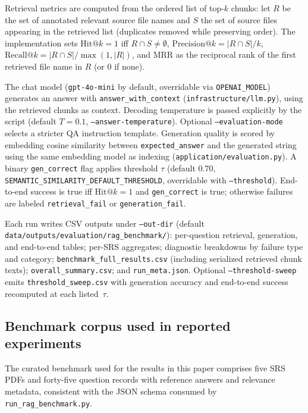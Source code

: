 \documentclass[conference]{IEEEtran}
\begin{document}
Retrieval metrics are computed from the ordered list of top-$k$ chunks: let $R$ be the set of annotated relevant source file names and $S$ the set of source files appearing in the retrieved list (duplicates removed while preserving order). The implementation sets $\text{Hit@}k{=}1$ iff $R \cap S \neq \emptyset$, $\text{Precision@}k = |R \cap S|/k$, $\text{Recall@}k = |R \cap S|/\max(1,|R|)$, and MRR as the reciprocal rank of the first retrieved file name in $R$ (or $0$ if none).

The chat model (\texttt{gpt-4o-mini} by default, overridable via \texttt{OPENAI\_MODEL}) generates an answer with \texttt{answer\_with\_context} (\texttt{infrastructure/llm.py}), using the retrieved chunks as context. Decoding temperature is passed explicitly by the script (default $T{=}0.1$, \texttt{--answer-temperature}). Optional \texttt{--evaluation-mode} selects a stricter QA instruction template. Generation quality is scored by embedding cosine similarity between \texttt{expected\_answer} and the generated string using the same embedding model as indexing (\texttt{application/evaluation.py}). A binary \texttt{gen\_correct} flag applies threshold $\tau$ (default $0.70$, \texttt{SEMANTIC\_SIMILARITY\_DEFAULT\_THRESHOLD}, overridable with \texttt{--threshold}). End-to-end success is true iff $\text{Hit@}k{=}1$ and \texttt{gen\_correct} is true; otherwise failures are labeled \texttt{retrieval\_fail} or \texttt{generation\_fail}.

Each run writes CSV outputs under \texttt{--out-dir} (default \texttt{data/outputs/evaluation/rag\_benchmark/}): per-question retrieval, generation, and end-to-end tables; per-SRS aggregates; diagnostic breakdowns by failure type and category; \texttt{benchmark\_full\_results.csv} (including serialized retrieved chunk texts); \texttt{overall\_summary.csv}; and \texttt{run\_meta.json}. Optional \texttt{--threshold-sweep} emits \texttt{threshold\_sweep.csv} with generation accuracy and end-to-end success recomputed at each listed~$\tau$.

\subsection{Benchmark corpus used in reported experiments}

The curated benchmark used for the results in this paper comprises five SRS PDFs and forty-five question records with reference answers and relevance metadata, consistent with the JSON schema consumed by \texttt{run\_rag\_benchmark.py}.
\end{document}
